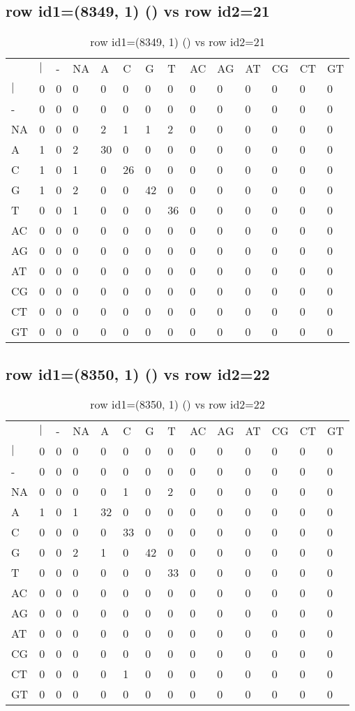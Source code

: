 \subsection{row id1=(8349, 1) () vs row id2=21}
\begin{center}
\begin{longtable}{|l|l|l|l|l|l|l|l|l|l|l|l|l|l|}
\caption{row id1=(8349, 1) () vs row id2=21} \label{table_dm362}\\
\hline
\\
\hline
&$|$&-&NA&A&C&G&T&AC&AG&AT&CG&CT&GT\\
$|$&0&0&0&0&0&0&0&0&0&0&0&0&0\\
-&0&0&0&0&0&0&0&0&0&0&0&0&0\\
NA&0&0&0&2&1&1&2&0&0&0&0&0&0\\
A&1&0&2&30&0&0&0&0&0&0&0&0&0\\
C&1&0&1&0&26&0&0&0&0&0&0&0&0\\
G&1&0&2&0&0&42&0&0&0&0&0&0&0\\
T&0&0&1&0&0&0&36&0&0&0&0&0&0\\
AC&0&0&0&0&0&0&0&0&0&0&0&0&0\\
AG&0&0&0&0&0&0&0&0&0&0&0&0&0\\
AT&0&0&0&0&0&0&0&0&0&0&0&0&0\\
CG&0&0&0&0&0&0&0&0&0&0&0&0&0\\
CT&0&0&0&0&0&0&0&0&0&0&0&0&0\\
GT&0&0&0&0&0&0&0&0&0&0&0&0&0\\
\hline
\end{longtable}
\end{center}

\subsection{row id1=(8350, 1) () vs row id2=22}
\begin{center}
\begin{longtable}{|l|l|l|l|l|l|l|l|l|l|l|l|l|l|}
\caption{row id1=(8350, 1) () vs row id2=22} \label{table_dm364}\\
\hline
\\
\hline
&$|$&-&NA&A&C&G&T&AC&AG&AT&CG&CT&GT\\
$|$&0&0&0&0&0&0&0&0&0&0&0&0&0\\
-&0&0&0&0&0&0&0&0&0&0&0&0&0\\
NA&0&0&0&0&1&0&2&0&0&0&0&0&0\\
A&1&0&1&32&0&0&0&0&0&0&0&0&0\\
C&0&0&0&0&33&0&0&0&0&0&0&0&0\\
G&0&0&2&1&0&42&0&0&0&0&0&0&0\\
T&0&0&0&0&0&0&33&0&0&0&0&0&0\\
AC&0&0&0&0&0&0&0&0&0&0&0&0&0\\
AG&0&0&0&0&0&0&0&0&0&0&0&0&0\\
AT&0&0&0&0&0&0&0&0&0&0&0&0&0\\
CG&0&0&0&0&0&0&0&0&0&0&0&0&0\\
CT&0&0&0&0&1&0&0&0&0&0&0&0&0\\
GT&0&0&0&0&0&0&0&0&0&0&0&0&0\\
\hline
\end{longtable}
\end{center}

